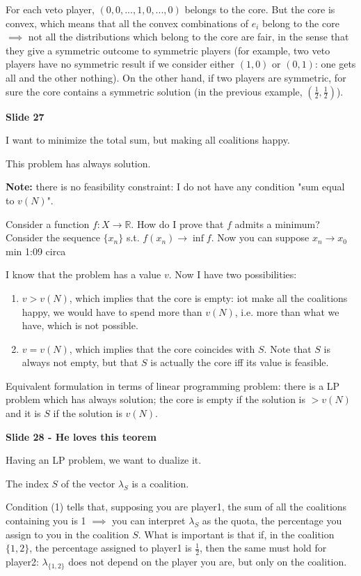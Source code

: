 \noindent For each veto player, $(0,0,...,1,0,...,0)$ belongs to the core. But 
the core is convex, which means that all the convex combinations of $e_i$ 
belong to the core $\implies$ not all the distributions which belong to the 
core are fair, in the sense that they give a symmetric outcome to symmetric 
players (for example, two veto players have no symmetric result if we consider 
either $(1,0)$ or $(0,1)$: one gets all and the other nothing). On the other 
hand, if two players are symmetric, for sure the core contains a symmetric 
solution (in the previous example, $(\frac{1}{2},\frac{1}{2})$). 

\bigskip
\noindent \textbf{Slide 27}

\noindent I want to minimize the total sum, but making all coalitions happy. 

\noindent This problem has always solution.

\noindent \textbf{Note:} there is no feasibility constraint: I do not have 
any condition "sum equal to $v(N)$".

\noindent Consider a function $f:X \rightarrow \mathbb{R}$. How do I prove that 
$f$ admits a minimum? Consider the sequence $\{x_n\}$ s.t. $f(x_n) \rightarrow 
\inf{f}$. Now you can suppose $x_n \rightarrow x_0$
{\huge min 1:09 circa}

\noindent I know that the problem has a value $v$. Now I have two possibilities:
\begin{enumerate}
\item $v > v(N)$, which implies that the core is empty: iot make all the 
coalitions happy, we would have to spend more than $v(N)$, i.e. more than what 
we have, which is not possible.
\item $v=v(N)$, which implies that the core coincides with $S$. Note that $S$ 
is always not empty, but that $S$ is actually the core iff its value is 
feasible. 
\end{enumerate}

\noindent Equivalent formulation in terms of linear programming problem: there 
is a LP problem which has always solution; the core is empty if the solution is 
$>v(N)$ and it is $S$ if the solution is $v(N)$.

\bigskip
\noindent \textbf{Slide 28 - He loves this teorem}

\noindent Having an LP problem, we want to dualize it.

\noindent The index $S$ of the vector $\lambda_S$ is a coalition.

\noindent Condition (1) tells that, supposing you are player1, the sum of all 
the coalitions containing you is 1 $\implies$ you can interpret $\lambda_S$ as 
the quota, the percentage you assign to you in the coalition $S$. What is 
important is that if, in the coalition $\{1,2\}$, the percentage assigned to 
player1 is $\frac{1}{2}$, then the same must hold for player2: 
$\lambda_{\{1,2\}}$ does not depend on the player you are, but only on the 
coalition.

